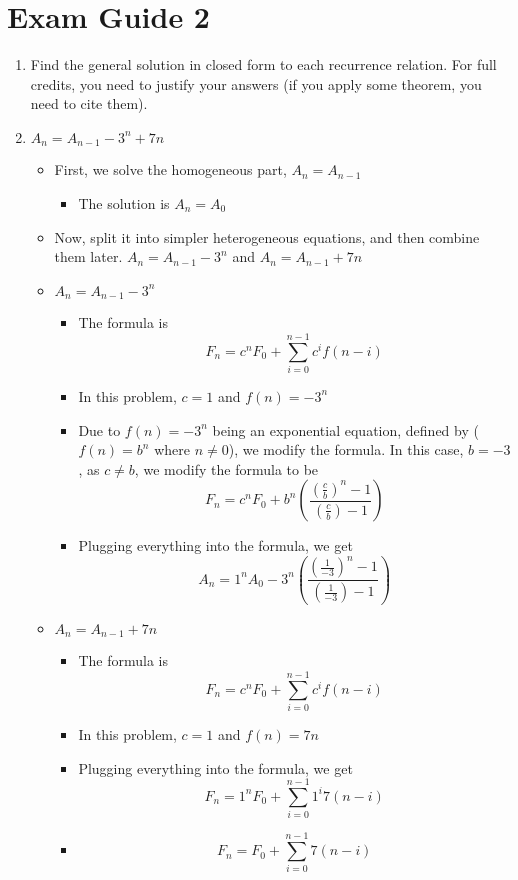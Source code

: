 
\section{Exam Guide 2}
\begin{enumerate}
\item [] Find the general solution in closed form to each recurrence relation. For full credits, you need to justify your answers (if you apply some theorem, you need to cite them).
\item $A_{n}=A_{n-1}-3^{n}+7n$
  \begin{itemize}
  \item First, we solve the homogeneous part, $A_{n}=A_{n-1}$
    \begin{itemize}
    \item The solution is $A_{n}=A_{0}$
    \end{itemize}
  \item Now, split it into simpler heterogeneous equations, and then combine them later. $A_{n}=A_{n-1}-3^{n}$ and $A_{n}=A_{n-1}+7n$
  \item $A_{n}=A_{n-1}-3^{n}$
    \begin{itemize}
    \item The formula is $$F_{n}=c^{n}F_{0} + \sum\limits_{i=0}^{n-1}c^{i}f(n-i)$$
    \item In this problem, $c=1$ and $f(n)=-3^{n}$
    \item Due to $f(n)=-3^{n}$ being an exponential equation, defined by ($f(n)=b^{n}$ where $n\neq0$), we modify the formula. In this case, $b=-3$, as $c\neq b$, we modify the formula to be $$F_{n}=c^{n}F_{0} + b^{n}\left(\frac{(\frac{c}{b})^{n}-1}{(\frac{c}{b})-1}\right)$$
    \item Plugging everything into the formula, we get $$A_{n}=1^{n}A_{0} - 3^{n}\left(\frac{(\frac{1}{-3})^{n}-1}{(\frac{1}{-3})-1}\right)$$
    \end{itemize}
  \item $A_{n}=A_{n-1}+7n$
    \begin{itemize}
    \item The formula is $$F_{n}=c^{n}F_{0} + \sum\limits_{i=0}^{n-1}c^{i}f(n-i)$$
    \item In this problem, $c=1$ and $f(n)=7n$
    \item Plugging everything into the formula, we get $$F_{n}=1^{n}F_{0} + \sum\limits_{i=0}^{n-1}1^{i}7(n-i)$$
    \item $$F_{n}=F_{0} + \sum\limits_{i=0}^{n-1}7(n-i)$$

\end{itemize}
\end{itemize}
\end{enumerate}
